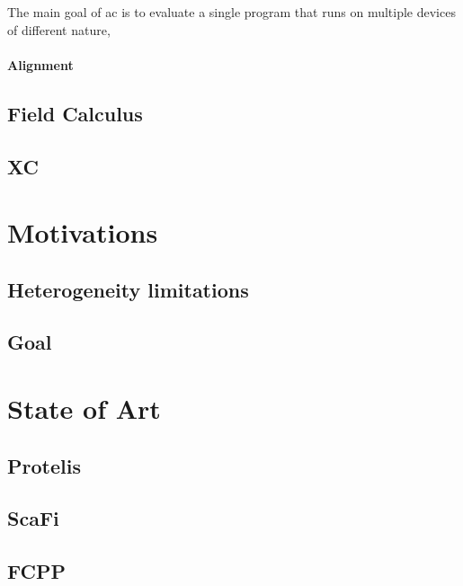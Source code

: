 
The main goal of \ac{ac} is to evaluate a single program that runs on multiple devices of different nature,

\paragraph{Alignment}

\subsection{Field Calculus}
\label{subsec:field-calculus}

\subsection{XC}
\label{subsec:xc}


\section{Motivations}
\label{sec:motivations}

\subsection{Heterogeneity limitations}
\label{subsec:heterogeneity-limitations}

\subsection{Goal}
\label{subsec:goal}


\section{State of Art}
\label{sec:state-of-art}

\subsection{Protelis}
\label{subsec:protelis}

\subsection{ScaFi}
\label{subsec:scafi}

\subsection{FCPP}
\label{subsec:fcpp}


